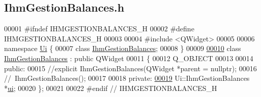 \hypertarget{_ihm_gestion_balances_8h_source}{}\subsection{Ihm\+Gestion\+Balances.\+h}
\label{_ihm_gestion_balances_8h_source}

\begin{DoxyCode}
00001 \textcolor{preprocessor}{#ifndef IHMGESTIONBALANCES\_H}
00002 \textcolor{preprocessor}{#define IHMGESTIONBALANCES\_H}
00003 
00004 \textcolor{preprocessor}{#include <QWidget>}
00005 
00006 \textcolor{keyword}{namespace }\hyperlink{namespace_ui}{Ui} \{
00007 \textcolor{keyword}{class }\hyperlink{class_ihm_gestion_balances}{IhmGestionBalances};
00008 \}
00009 
\hyperlink{class_ihm_gestion_balances}{00010} \textcolor{keyword}{class }\hyperlink{class_ihm_gestion_balances}{IhmGestionBalances} : \textcolor{keyword}{public} QWidget
00011 \{
00012     Q\_OBJECT
00013 
00014 \textcolor{keyword}{public}:
00015     \textcolor{comment}{//explicit IhmGestionBalances(QWidget *parent = nullptr);}
00016     \textcolor{comment}{//~IhmGestionBalances();}
00017 
00018 \textcolor{keyword}{private}:
\hyperlink{class_ihm_gestion_balances_a757ba93a01d5ac497f74e3a39b2eabde}{00019}     Ui::IhmGestionBalances *\hyperlink{class_ihm_gestion_balances_a757ba93a01d5ac497f74e3a39b2eabde}{ui};
00020 \};
00021 
00022 \textcolor{preprocessor}{#endif // IHMGESTIONBALANCES\_H}
\end{DoxyCode}

